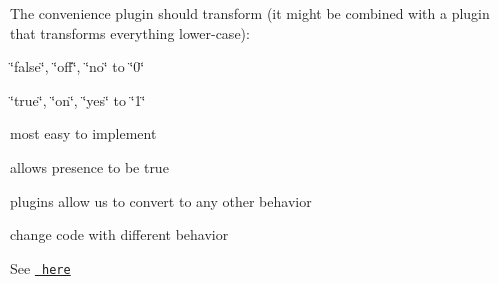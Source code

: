 The convenience plugin should transform (it might be combined with a plugin that transforms everything lower-\/case)\+:


\begin{DoxyItemize}
\item \char`\"{}false\char`\"{}, \char`\"{}off\char`\"{}, \char`\"{}no\char`\"{} to \char`\"{}0\char`\"{}
\item \char`\"{}true\char`\"{}, \char`\"{}on\char`\"{}, \char`\"{}yes\char`\"{} to \char`\"{}1\char`\"{}
\end{DoxyItemize}


\begin{DoxyItemize}
\item most easy to implement
\item allows presence to be true
\item plugins allow us to convert to any other behavior
\end{DoxyItemize}


\begin{DoxyItemize}
\item change code with different behavior
\end{DoxyItemize}

See \href{https://github.com/ElektraInitiative/libelektra/issues/308}{\texttt{ here}} 